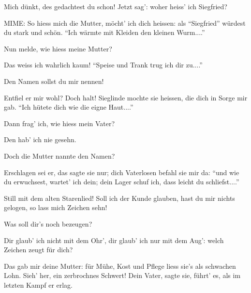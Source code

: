 \begin{drama}
\Siegfriedspeaks

Mich dünkt, des gedachtest du schon!
Jetzt sag': woher heiss' ich Siegfried?

MIME:
So hiess mich die Mutter,
möcht' ich dich heissen:
als ``Siegfried'' würdest
du stark und schön.
``Ich wärmte mit Kleiden
den kleinen Wurm....''

\Siegfriedspeaks

Nun melde, wie hiess meine Mutter?

\Mimespeaks

Das weiss ich wahrlich kaum!
``Speise und Trank
trug ich dir zu....''

\Siegfriedspeaks

Den Namen sollst du mir nennen!

\Mimespeaks

Entfiel er mir wohl? Doch halt!
Sieglinde mochte sie heissen,
die dich in Sorge mir gab.
``Ich hütete dich
wie die eigne Haut....''

\Siegfriedspeaks


Dann frag' ich, wie hiess mein Vater?

\Mimespeaks


Den hab' ich nie gesehn.

\Siegfriedspeaks

Doch die Mutter nannte den Namen?

\Mimespeaks

Erschlagen sei er,
das sagte sie nur;
dich Vaterlosen
befahl sie mir da:
``und wie du erwuchsest,
wartet' ich dein;
dein Lager schuf ich,
dass leicht du schliefst....''

\Siegfriedspeaks

Still mit dem alten
Starenlied!
Soll ich der Kunde glauben,
hast du mir nichts gelogen,
so lass mich Zeichen sehn!

\Mimespeaks

Was soll dir's noch bezeugen?

\Siegfriedspeaks

Dir glaub' ich nicht mit dem Ohr',
dir glaub' ich nur mit dem Aug':
welch Zeichen zeugt für dich?

\Mimespeaks


Das gab mir deine Mutter:
für Mühe, Kost und Pflege
liess sie's als schwachen Lohn.
Sieh' her, ein zerbrochnes Schwert!
Dein Vater, sagte sie, führt' es,
als im letzten Kampf er erlag.


\end{drama}
